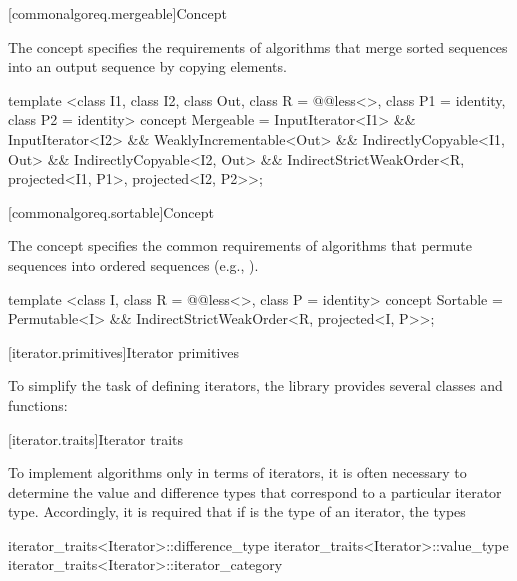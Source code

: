 [commonalgoreq.mergeable]{Concept }

\pnum
The  concept specifies the requirements of
algorithms that merge sorted sequences into an output sequence by copying elements.

%
\begin{codeblock}
  template <class I1, class I2, class Out,
      class R = @@less<>, class P1 = identity, class P2 = identity>
  concept Mergeable =
    InputIterator<I1> &&
    InputIterator<I2> &&
    WeaklyIncrementable<Out> &&
    IndirectlyCopyable<I1, Out> &&
    IndirectlyCopyable<I2, Out> &&
    IndirectStrictWeakOrder<R, projected<I1, P1>, projected<I2, P2>>;
\end{codeblock}

[commonalgoreq.sortable]{Concept }

\pnum
The  concept specifies the common requirements of algorithms that permute
sequences into ordered sequences (e.g., ).

%
\begin{codeblock}
  template <class I, class R = @@less<>, class P = identity>
  concept Sortable =
    Permutable<I> &&
    IndirectStrictWeakOrder<R, projected<I, P>>;
\end{codeblock}






[iterator.primitives]{Iterator primitives}

\pnum
To simplify the task of defining iterators, the library provides
several classes and functions:

[iterator.traits]{Iterator traits}



\pnum
{}%
To implement algorithms only in terms of iterators, it is often necessary to
determine the value and
difference types that correspond to a particular iterator type.
Accordingly, it is required that if
is the type of an iterator,
the types

%
%
%
\begin{codeblock}
iterator_traits<Iterator>::difference_type
iterator_traits<Iterator>::value_type
iterator_traits<Iterator>::iterator_category
\end{codeblock}


